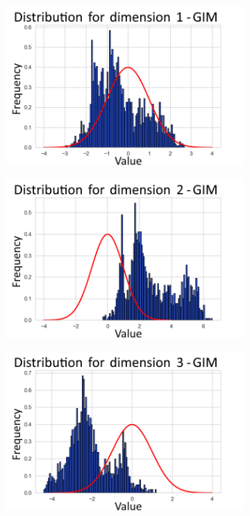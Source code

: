 \begin{figure}[h]
	\centering
	\begin{subfigure}[b]{0.25\textwidth}
		\centering
		\includegraphics[width=1\linewidth]{"graphs/distr/module2 kld0/_ distribution_latent_space_GIM_dim=0"}
	\end{subfigure}
	\hfill
	\begin{subfigure}[b]{0.25\textwidth}
		\centering
		\includegraphics[width=1\linewidth]{"graphs/distr/module2 kld0/_ distribution_latent_space_GIM_dim=1"}
	\end{subfigure}
	\hfill
	\begin{subfigure}[b]{0.25\textwidth}
		\centering
		\includegraphics[width=1\linewidth]{"graphs/distr/module2 kld0/_ distribution_latent_space_GIM_dim=2"}

\end{subfigure}
\end{figure}
